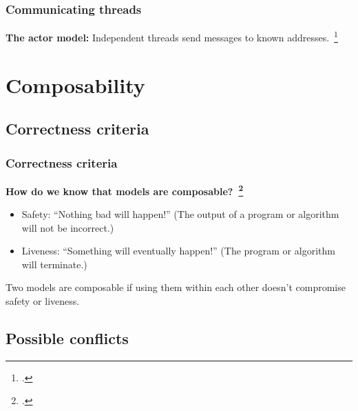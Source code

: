 \documentclass[aspectratio=1610]{beamer}
\begin{document}
  \begin{frame}
    \frametitle{Communicating threads}
    \centering
    
    \vfill
    \textbf{The actor model:} Independent threads send messages to known addresses.~\footcite{Agha1986}
  \end{frame}


  \section{Composability}

  \subsection{Correctness criteria}

  \begin{frame}
    \frametitle{Correctness criteria}

    \textbf{How do we know that models are composable?~\footcite{Swalens2014}}

    \begin{itemize}
      \item Safety: ``Nothing bad will happen!'' (The output of a program or algorithm will not be incorrect.)
      \item Liveness: ``Something will eventually happen!'' (The program or algorithm will terminate.)
    \end{itemize}

    Two models are composable if using them within each other doesn't compromise safety or liveness.
  \end{frame}

  \subsection{Possible conflicts}
\end{document}
